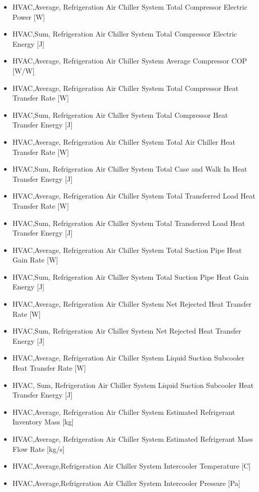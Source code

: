 \begin{itemize}
\item
  HVAC,Average, Refrigeration Air Chiller System Total Compressor Electric Power {[}W{]}
\item
  HVAC,Sum, Refrigeration Air Chiller System Total Compressor Electric Energy {[}J{]}
\item
  HVAC,Average, Refrigeration Air Chiller System Average Compressor COP {[}W/W{]}
\item
  HVAC,Average, Refrigeration Air Chiller System Total Compressor Heat Transfer Rate {[}W{]}
\item
  HVAC,Sum, Refrigeration Air Chiller System Total Compressor Heat Transfer Energy {[}J{]}
\item
  HVAC,Average, Refrigeration Air Chiller System Total Air Chiller Heat Transfer Rate {[}W{]}
\item
  HVAC,Sum, Refrigeration Air Chiller System Total Case and Walk In Heat Transfer Energy {[}J{]}
\item
  HVAC,Average, Refrigeration Air Chiller System Total Transferred Load Heat Transfer Rate {[}W{]}
\item
  HVAC,Sum, Refrigeration Air Chiller System Total Transferred Load Heat Transfer Energy {[}J{]}
\item
  HVAC,Average, Refrigeration Air Chiller System Total Suction Pipe Heat Gain Rate {[}W{]}
\item
  HVAC,Sum, Refrigeration Air Chiller System Total Suction Pipe Heat Gain Energy {[}J{]}
\item
  HVAC,Average, Refrigeration Air Chiller System Net Rejected Heat Transfer Rate {[}W{]}
\item
  HVAC,Sum, Refrigeration Air Chiller System Net Rejected Heat Transfer Energy {[}J{]}
\item
  HVAC,Average, Refrigeration Air Chiller System Liquid Suction Subcooler Heat Transfer Rate {[}W{]}
\item
  HVAC, Sum, Refrigeration Air Chiller System Liquid Suction Subcooler Heat Transfer Energy {[}J{]}
\item
  HVAC,Average, Refrigeration Air Chiller System Estimated Refrigerant Inventory Mass {[}kg{]}
\item
  HVAC,Average, Refrigeration Air Chiller System Estimated Refrigerant Mass Flow Rate {[}kg/s{]}
\item
  HVAC,Average,Refrigeration Air Chiller System Intercooler Temperature {[}C{]}
\item
  HVAC,Average,Refrigeration Air Chiller System Intercooler Pressure {[}Pa{]}

\end{itemize}
